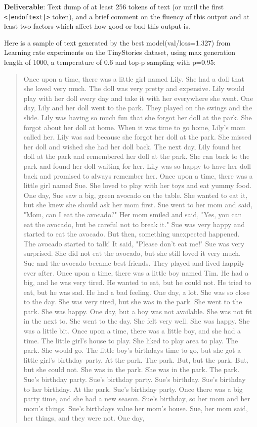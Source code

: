 \textbf{Deliverable}: Text dump of at least 256 tokens of text (or until the first \lstinline{<|endoftext|>} token), and a brief comment on the fluency of this output and at least two factors which affect how good or bad this output is.

\begin{answer}

Here is a sample of text generated by the best model(val/loss=1.327) from Learning rate experiments on the TinyStories dataset, using max generation length of 1000, a temperature of 0.6 and top-p sampling with p=0.95:

\begin{quote}
Once upon a time, there was a little girl named Lily. She had a doll that she loved very much. The doll was very pretty and expensive. Lily would play with her doll every day and take it with her everywhere she went. One day, Lily and her doll went to the park. They played on the swings and the slide. Lily was having so much fun that she forgot her doll at the park. She forgot about her doll at home. When it was time to go home, Lily's mom called her. Lily was sad because she forgot her doll at the park. She missed her doll and wished she had her doll back. The next day, Lily found her doll at the park and remembered her doll at the park. She ran back to the park and found her doll waiting for her. Lily was so happy to have her doll back and promised to always remember her. Once upon a time, there was a little girl named Sue. She loved to play with her toys and eat yummy food. One day, Sue saw a big, green avocado on the table. She wanted to eat it, but she knew she should ask her mom first. Sue went to her mom and said, "Mom, can I eat the avocado?" Her mom smiled and said, "Yes, you can eat the avocado, but be careful not to break it." Sue was very happy and started to eat the avocado. But then, something unexpected happened. The avocado started to talk! It said, "Please don't eat me!" Sue was very surprised. She did not eat the avocado, but she still loved it very much. Sue and the avocado became best friends. They played and lived happily ever after. Once upon a time, there was a little boy named Tim. He had a big, and he was very tired. He wanted to eat, but he could not. He tried to eat, but he was sad. He had a bad feeling. One day, a lot. She was so close to the day. She was very tired, but she was in the park. She went to the park. She was happy. One day, but a boy was not available. She was not fit in the next to. She went to the day. She felt very well. She was happy. She was a little bit. Once upon a time, there was a little boy, and she had a time. The little girl's house to play. She liked to play area to play. The park. She would go. The little boy's birthdays time to go, but she got a little girl's birthday party. At the park. The park. But, but the park. But, but she could not. She was in the park. She was in the park. The park. Sue's birthday party. Sue's birthday party. Sue's birthday. Sue's birthday to her birthday. At the park. Sue's birthday party. Once there was a big party time, and she had a new season. Sue's birthday, so her mom and her mom's things. Sue's birthdays value her mom's house. Sue, her mom said, her things, and they were not. One day, 
\end{quote}
\end{answer}
